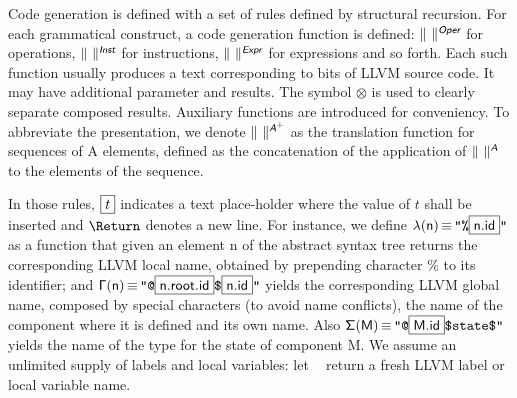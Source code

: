\documentclass{llncs}
\newcommand{\trad}[2]{\ensuremath{\lVert \textsf{#1} \rVert^{\textit{#2}}}}
\newcommand{\nl}[0]{\text{\Return}}
\DeclareMathOperator{\isdef}{\equiv}
\DeclareMathOperator{\name}{\mathcal{L}()}
\newcommand{\llvm}[1]{\texttt{#1}}
\newcommand{\B}[1]{\textsf{#1}}
\newcommand{\ListOf}[1]{$\mbox{#1}^+$}
\newcommand{\PH}[1]{\framebox{$#1$}}
\newcommand{\sep}[0]{\otimes}
\newcommand{\intf}[0]{\ensuremath{\mathbb{I}}}
\newcommand{\Global}[0]{\ensuremath{\sf\Gamma}}
\newcommand{\local}[0]{\ensuremath{\sf\lambda}}
\newcommand{\state}[0]{\ensuremath{\sf\Sigma}}
\begin{document}
Code generation is defined with a set of rules defined by structural
recursion. For each grammatical construct, a code generation function is
defined: $\trad{~}{\B{Oper}}$ for operations, $\trad{~}{\B{Inst}}$ for
instructions, $\trad{~}{\B{Expr}}$ for expressions and so forth. Each such
function usually produces a text corresponding to bits of LLVM source code. It
may have additional parameter and results. The symbol $\sep$ is used to clearly
separate composed results. Auxiliary functions are introduced for
conveniency. To abbreviate the presentation, we denote
$\trad{~}{\ListOf{\B{A}}}$ as the translation function for sequences of \B{A}
elements, defined as the concatenation of the application of $\trad{~}{\B{A}}$
to the elements of the sequence.

In those rules, $\PH{t}$ indicates a text place-holder where the value of $t$
shall be inserted and $\nl$ denotes a new line. For instance, we define
$\local(\B{n}) \isdef \llvm{"\%\PH{\B{n.id}}"}$ as a function that given an
element \B{n} of the abstract syntax tree returns the corresponding LLVM local
name, obtained by prepending character \% to its identifier; and $\Global(\B{n})
\isdef \llvm{"@\PH{\B{n.root.id}}\$\PH{\B{n.id}}"}$ yields the corresponding
LLVM global name, composed by special characters (to avoid name conflicts), the
name of the component where it is defined and its own name. Also $\state(\B{M})
\isdef \llvm{"@\PH{\B{M.id}}\$state\$"}$ yields the name of the type for the
state of component \B{M}. We assume an unlimited supply of labels and local
variables: let $\name$ return a fresh LLVM label or local variable name.
%
%
%
%
%
\end{document}
